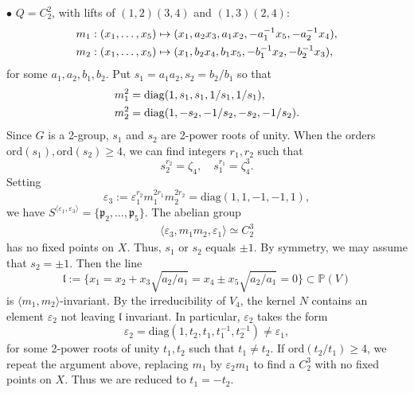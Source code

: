 \documentclass[12pt,reqno]{amsart}
\theoremstyle{plain}
\theoremstyle{remark}
\theoremstyle{definition}
\numberwithin{equation}{section}
\def\bP{{\mathbb P}}
\begin{document}
$\bullet$ $Q=C_2^2$, with lifts of $(1,2)(3,4)$ and $(1,3)(2,4)$:
\begin{align}\label{eqn:m1m2}
    m_1&:(x_1,\ldots,x_5)\mapsto(x_1,a_2x_3,a_1x_2,-a_1^{-1}x_5,-a_2^{-1}x_4),\\
    m_2&:(x_1,\ldots,x_5)\mapsto(x_1,b_2x_4,b_1x_5,-b_1^{-1}x_2,-b_2^{-1}x_3),\notag
\end{align}
for some $a_1,a_2,b_1,b_2$. Put $s_1=a_1a_2, s_2=b_2/b_1$ so  that 
\begin{align*}
    m_1^2&=\mathrm{diag}(1,s_1,s_1,1/s_1,1/s_1),\\
m_2^2&=\mathrm{diag}(1,-s_2,-1/s_2,-s_2,-1/s_2).\notag
\end{align*}
Since $G$ is a 2-group, $s_1$ and $s_2$ are 2-power roots of unity. 
When the orders $\mathrm{ord}(s_1), \mathrm{ord}(s_2)\ge 4$, we can find integers $r_1,r_2$ such that 
$$
s_2^{r_2}=\zeta_4,\quad s_1^{r_1}=\zeta_4^3.
$$
Setting
$$
\varepsilon_3:=\varepsilon_1^{r_2}m_1^{2r_1} m_2^{2r_2}=\mathrm{diag}(1,1,-1,-1,1),
$$
we have $S^{\langle\varepsilon_1, \varepsilon_3\rangle}=\{ \mathfrak p_2,\ldots,\mathfrak p_5\}$. The abelian group 
\begin{align}\label{eqn:V4C2^3}
\langle \varepsilon_3,m_1m_2, \varepsilon_1\rangle\simeq C_2^3
 \end{align}
 has no fixed points on $X$. Thus, $s_1$ or $s_2$ equals $\pm 1$. By symmetry, we may assume that $s_2=\pm 1$. Then the line  
$$
\mathfrak l:=\{x_1=x_2+x_3\sqrt{a_2/a_1}=x_4\pm x_5\sqrt{a_2/a_1}=0\} \subset \bP(V)
$$
is $\langle m_1,m_2\rangle$-invariant. 
By the irreducibility of $V_4$, %
the kernel $N$ contains an element $\varepsilon_2$ not leaving $\mathfrak l$ invariant. In particular, $\varepsilon_2$ takes the form
\begin{equation} 
\label{eqn:varep2}
\!\!\!\varepsilon_2=\mathrm{diag}(1,t_2,t_1,t_1^{-1},t_2^{-1})\neq\varepsilon_1,
\end{equation}
for some 2-power roots of unity $t_1,t_2$ such that $t_1\ne t_2$. 
 If $\mathrm{ord}(t_2/t_1)\ge 4$, we repeat the argument above, replacing $m_1$ by $\varepsilon_2m_1$ to find a $C_2^3$ with no fixed points on $X$. 
Thus we are reduced to  $t_1=-t_2$. 
\end{document}
